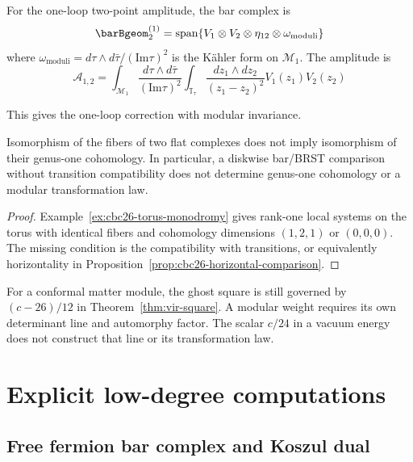 \begin{example}
For the one-loop two-point amplitude, the bar complex is
\[\barBgeom^{(1)}_2 = \text{span}\{V_1 \otimes V_2 \otimes \eta_{12} \otimes \omega_{\text{moduli}}\}\]
where $\omega_{\text{moduli}} = d\tau \wedge d\bar{\tau}/(\text{Im}\tau)^2$ is the K\"ahler form on $\mathcal{M}_1$.
The amplitude is
\[\mathcal{A}_{1,2} = \int_{\mathcal{M}_1} \frac{d\tau \wedge d\bar{\tau}}{(\text{Im}\tau)^2} \int_{\mathbb{T}_\tau} \frac{dz_1 \wedge dz_2}{(z_1-z_2)^2} V_1(z_1) V_2(z_2)\]

This gives the one-loop correction with modular invariance.
\end{example}



\begin{proposition}
\label{thm:modular-anomaly-km-w}
Isomorphism of the fibers of two flat complexes does not imply isomorphism of their genus-one cohomology.
In particular, a diskwise bar/BRST comparison without transition compatibility does not determine genus-one cohomology or a modular transformation law.
\end{proposition}

\begin{proof}
Example~\ref{ex:cbc26-torus-monodromy} gives rank-one local systems on the torus with identical fibers and cohomology dimensions $(1,2,1)$ or $(0,0,0)$.
The missing condition is the compatibility with transitions, or equivalently horizontality in Proposition~\ref{prop:cbc26-horizontal-comparison}.
\end{proof}

For a conformal matter module, the ghost square is still governed by $(c-26)/12$ in Theorem~\ref{thm:vir-square}.
A modular weight requires its own determinant line and automorphy factor.
The scalar $c/24$ in a vacuum energy does not construct that line or its transformation law.


\section{Explicit low-degree computations}
\label{sec:explicit-low-degree}

\subsection{Free fermion bar complex and Koszul dual}

